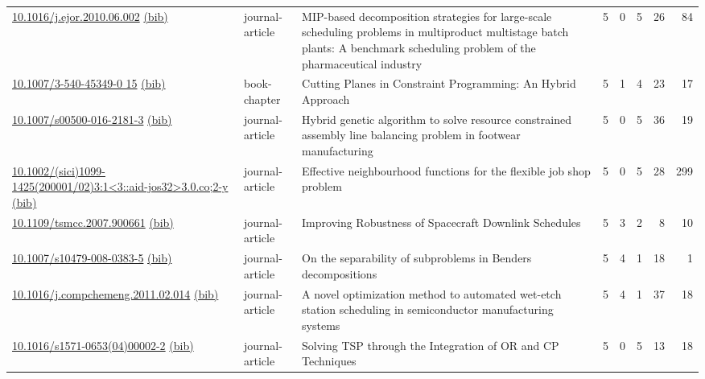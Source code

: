 {\begin{longtable}{p{5cm}lp{11cm}rrrrr}
\href{http://dx.doi.org/10.1016/j.ejor.2010.06.002}{10.1016/j.ejor.2010.06.002} \href{https://www.doi2bib.org/bib/10.1016/j.ejor.2010.06.002}{(bib)} & journal-article & MIP-based decomposition strategies for large-scale scheduling problems in multiproduct multistage batch plants: A benchmark scheduling problem of the pharmaceutical industry & 5 & 0 & 5 & 26 & 84 \\
\href{http://dx.doi.org/10.1007/3-540-45349-0_15}{10.1007/3-540-45349-0 15} \href{https://www.doi2bib.org/bib/10.1007/3-540-45349-0_15}{(bib)} & book-chapter & Cutting Planes in Constraint Programming: An Hybrid Approach & 5 & 1 & 4 & 23 & 17 \\
\href{http://dx.doi.org/10.1007/s00500-016-2181-3}{10.1007/s00500-016-2181-3} \href{https://www.doi2bib.org/bib/10.1007/s00500-016-2181-3}{(bib)} & journal-article & Hybrid genetic algorithm to solve resource constrained assembly line balancing problem in footwear manufacturing & 5 & 0 & 5 & 36 & 19 \\
\href{http://dx.doi.org/10.1002/(sici)1099-1425(200001/02)3:1<3::aid-jos32>3.0.co;2-y}{10.1002/(sici)1099-1425(200001/02)3:1<3::aid-jos32>3.0.co;2-y} \href{https://www.doi2bib.org/bib/10.1002/(sici)1099-1425(200001/02)3:1<3::aid-jos32>3.0.co;2-y}{(bib)} & journal-article & Effective neighbourhood functions for the flexible job shop problem & 5 & 0 & 5 & 28 & 299 \\
\href{http://dx.doi.org/10.1109/tsmcc.2007.900661}{10.1109/tsmcc.2007.900661} \href{https://www.doi2bib.org/bib/10.1109/tsmcc.2007.900661}{(bib)} & journal-article & Improving Robustness of Spacecraft Downlink Schedules & 5 & 3 & 2 & 8 & 10 \\
\href{http://dx.doi.org/10.1007/s10479-008-0383-5}{10.1007/s10479-008-0383-5} \href{https://www.doi2bib.org/bib/10.1007/s10479-008-0383-5}{(bib)} & journal-article & On the separability of subproblems in Benders decompositions & 5 & 4 & 1 & 18 & 1 \\
\href{http://dx.doi.org/10.1016/j.compchemeng.2011.02.014}{10.1016/j.compchemeng.2011.02.014} \href{https://www.doi2bib.org/bib/10.1016/j.compchemeng.2011.02.014}{(bib)} & journal-article & A novel optimization method to automated wet-etch station scheduling in semiconductor manufacturing systems & 5 & 4 & 1 & 37 & 18 \\
\href{http://dx.doi.org/10.1016/s1571-0653(04)00002-2}{10.1016/s1571-0653(04)00002-2} \href{https://www.doi2bib.org/bib/10.1016/s1571-0653(04)00002-2}{(bib)} & journal-article & Solving TSP through the Integration of OR and CP Techniques & 5 & 0 & 5 & 13 & 18 \\

\end{longtable}}
